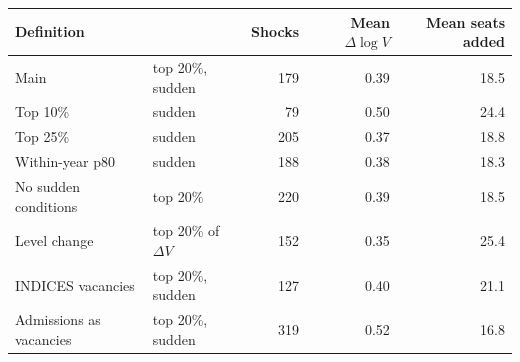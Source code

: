 \begin{tabular}{llrrr}
\toprule
Definition & & Shocks & Mean \(\Delta\log V\) & Mean seats added \\
\midrule
Main & top 20\%, sudden &       179 &  0.39 &   18.5 \\
Top 10\% & sudden &        79 &  0.50 &   24.4 \\
Top 25\% & sudden &       205 &  0.37 &   18.8 \\
Within-year p80 & sudden &       188 &  0.38 &   18.3 \\
No sudden conditions & top 20\% &       220 &  0.39 &   18.5 \\
Level change & top 20\% of \(\Delta V\) &       152 &  0.35 &   25.4 \\
INDICES vacancies & top 20\%, sudden &       127 &  0.40 &   21.1 \\
Admissions as vacancies & top 20\%, sudden &       319 &  0.52 &   16.8 \\
\bottomrule
\end{tabular}
